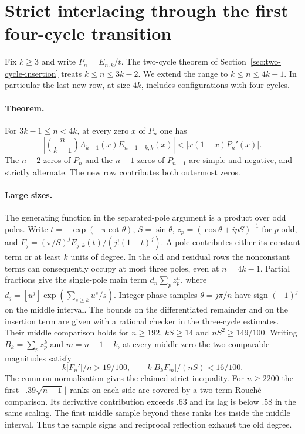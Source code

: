 \section{Strict interlacing through the first four-cycle transition}
\label{sec:three-cycle}
Fix $k\ge3$ and write $P_n=E_{n,k}/t$. The two-cycle theorem of
Section~\ref{sec:two-cycle-insertion} treats $k\le n\le 3k-2$.
We extend the range to $k\le n\le4k-1$. In particular the last new
row, at size $4k$, includes configurations with four cycles.

\paragraph{Theorem.}
For $3k-1\le n<4k$, at every zero $x$ of $P_n$ one has
\[
\left|\binom n{k-1}A_{k-1}(x) E_{n+1-k,k}(x)\right|
  < |x(1-x)P_n'(x)|.
\]
The $n-2$ zeros of $P_n$ and the $n-1$ zeros of $P_{n+1}$ are
simple and negative, and strictly alternate. The new row contributes
both outermost zeros.

\paragraph{Large sizes.}
The generating function in the separated-pole argument is a product
over odd poles. Write $t=-\exp(-\pi\cot\theta)$,
$S=\sin\theta$, $z_p=(\cos\theta+ip S)^{-1}$ for $p$ odd, and
$F_j=(\pi/S)^j E_{j,k}(t)/(j!(1-t)^j)$. A pole contributes either
its constant term or at least $k$ units of degree. In the old and
residual rows the nonconstant terms can consequently occupy at most
three poles, even at $n=4k-1$. Partial fractions give the single-pole
main term $d_n\sum_p z_p^n$, where
$d_j=[u^j]\exp(\sum_{s\ge k}u^s/s)$.
Integer phase samples $\theta=j\pi/n$ have sign $(-1)^j$
on the middle interval. The bounds on the differentiated remainder
and on the insertion term are given with a rational checker in the
\href{https://github.com/ProgramComputer/open-math-research/blob/main/topics/long-cycle-excedances/three-cycle-2200.md}{three-cycle estimates}.
Their middle comparison holds for $n\ge192$, $kS\ge14$ and
$nS^2\ge149/100$. Writing $B_k=\sum_p z_p^k$ and $m=n+1-k$,
at every middle zero the two comparable magnitudes satisfy
\[
 k|F_n'|/n>19/100, \qquad k|B_k F_m|/(n S)<16/100 .
\]
The common normalization gives the claimed strict inequality. For
$n\ge2200$ the first $\lfloor .39\sqrt{n-1}\rfloor$ ranks on each
side are covered by a two-term Rouch\'e comparison. Its derivative
contribution exceeds $.63$ and its lag is below $.58$ in the same
scaling. The first middle sample beyond these ranks lies inside
the middle interval. Thus the sample signs and reciprocal reflection
exhaust the old degree.

